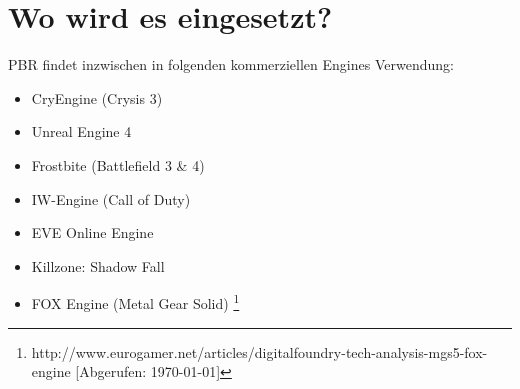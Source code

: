 
\cite{Bjorke2007}


\section{Wo wird es eingesetzt?}
\label{sec:pbr-wo}

\ac{PBR} findet inzwischen in folgenden kommerziellen Engines Verwendung:
\begin{itemize}
\item CryEngine (Crysis 3) \parencite{Schulz2014}
\item Unreal Engine 4 \parencite{Martin2012}
\item Frostbite (Battlefield 3 \& 4) \parencite{Lagarde2014}
\item IW-Engine (Call of Duty) \parencite{Lazarov2011}
\item EVE Online Engine \parencite{CCP2014}
\item Killzone: Shadow Fall \parencite{Drobot2013}
\item FOX Engine (Metal Gear Solid) \footnote{http://www.eurogamer.net/articles/digitalfoundry-tech-analysis-mgs5-fox-engine [Abgerufen: \today]}
\end{itemize}
